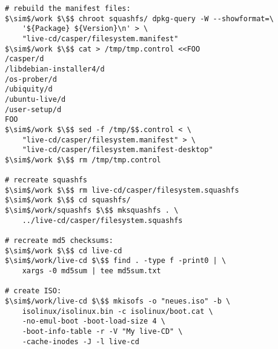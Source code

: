 \begin{lstlisting}[caption={Rebuilding the live-CD},float=ht,label={code:rebuild}]
# rebuild the manifest files:
$\sim$/work $\$$ chroot squashfs/ dpkg-query -W --showformat=\
	'${Package} ${Version}\n' > \
	"live-cd/casper/filesystem.manifest"
$\sim$/work $\$$ cat > /tmp/tmp.control <<FOO
/casper/d
/libdebian-installer4/d
/os-prober/d
/ubiquity/d
/ubuntu-live/d
/user-setup/d
FOO 
$\sim$/work $\$$ sed -f /tmp/$$.control < \
	"live-cd/casper/filesystem.manifest" > \
	"live-cd/casper/filesystem.manifest-desktop"
$\sim$/work $\$$ rm /tmp/tmp.control

# recreate squashfs
$\sim$/work $\$$ rm live-cd/casper/filesystem.squashfs
$\sim$/work $\$$ cd squashfs/
$\sim$/work/squashfs $\$$ mksquashfs . \
	../live-cd/casper/filesystem.squashfs

# recreate md5 checksums:
$\sim$/work $\$$ cd live-cd
$\sim$/work/live-cd $\$$ find . -type f -print0 | \
	xargs -0 md5sum | tee md5sum.txt

# create ISO:
$\sim$/work/live-cd $\$$ mkisofs -o "neues.iso" -b \
	isolinux/isolinux.bin -c isolinux/boot.cat \
	-no-emul-boot -boot-load-size 4 \
	-boot-info-table -r -V "My live-CD" \
	-cache-inodes -J -l live-cd
\end{lstlisting}
